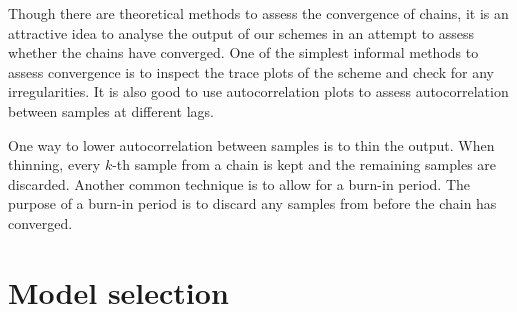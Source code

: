 Though there are theoretical methods to assess the convergence of chains, it is an attractive idea to
analyse the output of our schemes in an attempt to assess whether the chains have converged. One of
the simplest informal methods to assess convergence is to inspect the trace plots of the scheme and
check for any irregularities. It is also good to use autocorrelation plots to assess autocorrelation
between samples at different lags.

One way to lower autocorrelation between samples is to thin the output. When thinning, every $k$-th
sample from a chain is kept and the remaining samples are discarded. Another common technique is to
allow for a burn-in period. The purpose of a burn-in period is to discard any samples from before the
chain has converged.

\section{Model selection}
\label{sec:model_comparison}
